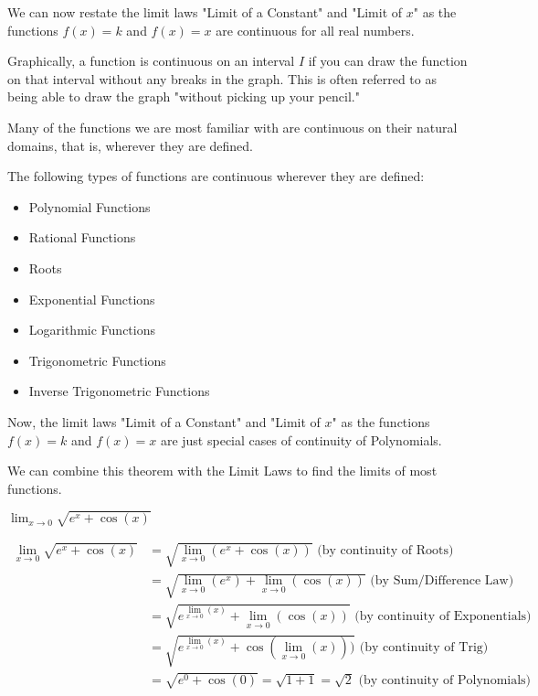 \documentclass{ximera}
\begin{document}
We can now restate the limit laws "Limit of a Constant" and "Limit of $x$" as the functions $f(x)=k$ and  $f(x)=x$ are continuous for all real numbers.

Graphically, a function is continuous on an interval $I$ if you can draw the function on that interval without any breaks in the graph.  This is often referred to as being able to draw the graph "without picking up your pencil."  

Many of the functions we are most familiar with are continuous on their natural domains, that is, wherever they are defined.

\begin{theorem}\label{theorem:continuity}
The following types of functions are continuous wherever they are defined:
\begin{itemize}
\item Polynomial Functions
\item Rational Functions
\item Roots
\item Exponential Functions
\item Logarithmic Functions 
\item Trigonometric Functions
\item Inverse Trigonometric Functions
\end{itemize}
\end{theorem}

Now, the limit laws "Limit of a Constant" and "Limit of $x$" as the functions $f(x)=k$ and  $f(x)=x$ are just special cases of continuity of Polynomials.

We can combine this theorem with the Limit Laws to find the limits of most functions.
\begin{example}
$\lim_{x \to 0} \sqrt{e^{x}+\cos(x)}$
\end{example}
\begin{solution}
\begin {align}
\lim_{x \to 0} \sqrt{e^{x}+\cos(x)} &= 
\sqrt{\lim_{x \to 0} (e^{x}+\cos(x))} \text{\ \ (by continuity of Roots)}\\
&= \sqrt{\lim_{x \to 0} (e^{x})+\lim_{x \to 0} (\cos(x))} \text{\ \ (by Sum/Difference Law)}\\
&= \sqrt{e^{\lim_{x \to 0} (x)}+\lim_{x \to 0} (\cos(x))} \text{\ \ (by continuity of Exponentials)}\\
&= \sqrt{e^{\lim_{x \to 0} (x)}+ \cos(\lim_{x \to 0}(x)))} \text{\ \ (by continuity of Trig)}\\
&= \sqrt{e^{0}+ \cos(0)}=\sqrt{1+1}=\sqrt{2} \text{\ \ (by continuity of Polynomials)}
\end{align}
\end{solution}
\end{document}
